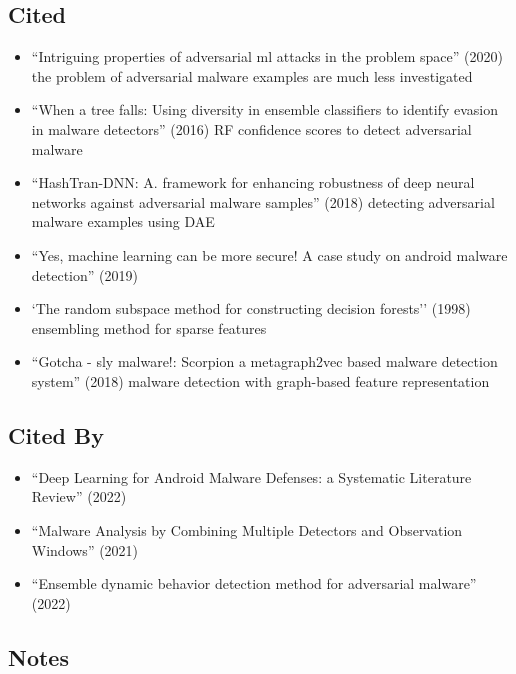 \documentclass{article}
\begin{document}
\subsection*{Cited}
\begin{itemize}
\item ``Intriguing properties of adversarial ml attacks in the problem space'' (2020) the problem of adversarial malware examples are much less investigated
\item ``When a tree falls: Using diversity in ensemble classifiers to identify evasion in malware detectors'' (2016) RF confidence scores to detect adversarial malware
\item ``HashTran-DNN: A. framework for enhancing robustness of deep neural networks against adversarial malware samples'' (2018) detecting adversarial malware examples using DAE
\item ``Yes, machine learning can be more secure! A case study on android malware detection'' (2019)
\item `The random subspace method for constructing decision forests'' (1998) ensembling method for sparse features
\item ``Gotcha - sly malware!: Scorpion a metagraph2vec based malware detection system'' (2018) malware detection with graph-based feature representation
\end{itemize}

\subsection*{Cited By}
\begin{itemize}
\item ``Deep Learning for Android Malware Defenses: a Systematic Literature Review'' (2022)
\item ``Malware Analysis by Combining Multiple Detectors and Observation Windows'' (2021)
\item ``Ensemble dynamic behavior detection method for adversarial malware'' (2022)
\end{itemize}

\subsection*{Notes}
\end{document}
